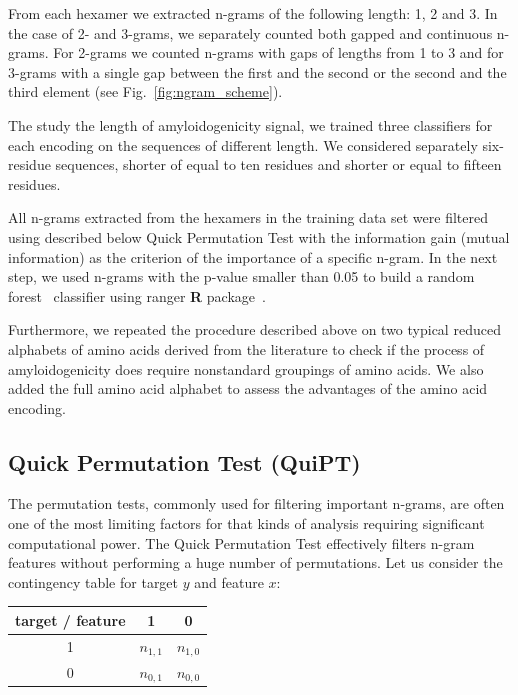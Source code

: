 \documentclass{bioinfo}
\begin{document}
\begin{methods}
  From each hexamer we extracted n-grams of the following length: 1, 2 and 3. In 
the case of 2- and 3-grams, we separately counted both gapped and continuous 
n-grams. For 2-grams we counted n-grams with gaps of lengths from 1 to 3 and for 
3-grams with a single gap between the first and the second or the second and the 
third element (see Fig.~\ref{fig:ngram_scheme}).

  The study the length of amyloidogenicity signal, we trained three 
classifiers for each encoding on the sequences of different length. We 
considered separately six-residue sequences, shorter of equal to ten residues 
and shorter or equal to fifteen residues.

  All n-grams extracted from the hexamers in the training data set were filtered 
using described below Quick Permutation Test with the information gain (mutual 
information) as the criterion of the importance of a specific n-gram. In the 
next step, we used n-grams with the p-value smaller than 0.05 to build a random 
forest~\citep{breiman_random_2001} classifier using ranger \textbf{R} 
package~\citep{wright_ranger:_2015}. 

  Furthermore, we repeated the procedure described above on two typical reduced 
alphabets of amino acids derived from the literature to check if the process of 
amyloidogenicity does require nonstandard groupings of amino acids. We also 
added the full amino acid alphabet to assess the advantages of the amino acid 
encoding.

\subsection{Quick Permutation Test (QuiPT)}

The permutation tests, commonly used for filtering important n-grams, are 
often one of the most limiting factors for that kinds of analysis requiring 
significant computational power. The Quick Permutation Test effectively filters 
n-gram features without performing a huge number of permutations. Let us 
consider the contingency table for target $y$ and feature $x$:

\begin{center}
\begin{tabular}{ | c || c | c | }
  \hline			
  target / feature & 1 & 0 \\ \hline
 1 & $n_{1,1}$ & $n_{1,0}$ \\
 0 & $n_{0,1}$ & $n_{0,0}$ \\
  \hline  
\end{tabular} 
\end{center}


\end{methods}
\end{document}
